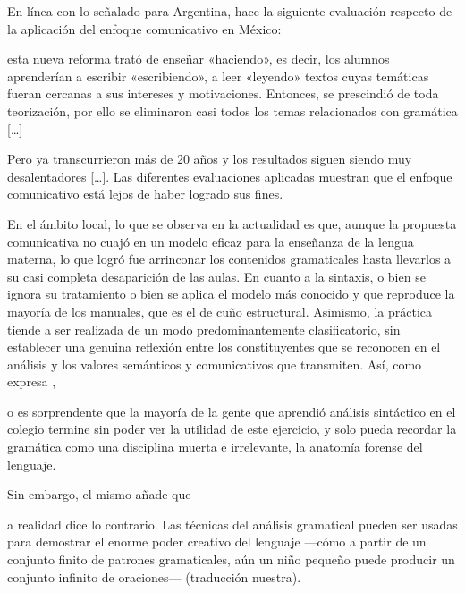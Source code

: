 En línea con lo señalado para Argentina, \textcite[18]{munguia2015} hace la
siguiente evaluación respecto de la aplicación del enfoque comunicativo en
México:

\begin{cita}
esta nueva reforma trató de enseñar «haciendo», es decir, los alumnos
aprenderían a escribir «escribiendo», a leer «leyendo» textos cuyas temáticas
fueran cercanas a sus intereses y motivaciones. Entonces, se prescindió de toda
teorización, por ello se eliminaron casi todos los temas relacionados con
gramática [\ldots]

Pero ya transcurrieron más de 20 años y los resultados siguen siendo muy
desalentadores [\ldots]. Las diferentes evaluaciones aplicadas muestran que el
enfoque comunicativo está lejos de haber logrado sus fines.
\end{cita}

En el ámbito local, lo que se observa en la actualidad es que, aunque la
propuesta comunicativa no cuajó en un modelo eficaz para la enseñanza de la
lengua materna, lo que logró fue arrinconar los contenidos gramaticales hasta
llevarlos a su casi completa desaparición de las aulas. En cuanto a la
sintaxis, o bien se ignora su tratamiento o bien se aplica el modelo más
conocido y que reproduce la mayoría de los manuales, que es el de cuño
estructural. Asimismo, la práctica tiende a ser realizada de un modo
predominantemente clasificatorio, sin establecer una genuina reflexión entre
los constituyentes que se reconocen en el análisis y los valores semánticos y
comunicativos que transmiten. Así, como expresa \textcite{crystal2007},

\begin{cita}
[n]o es sorprendente que la mayoría de la gente que aprendió análisis
sintáctico en el colegio termine sin poder ver la utilidad de este ejercicio, y
solo pueda recordar la gramática como una disciplina muerta e irrelevante, la
anatomía forense del lenguaje.
\end{cita}

\noindent Sin embargo, el mismo \textcite{crystal2007} añade que

\begin{cita}
[l]a realidad dice lo contrario. Las técnicas del análisis gramatical pueden
ser usadas para demostrar el enorme poder creativo del lenguaje ---cómo a
partir de un conjunto finito de patrones gramaticales, aún un niño pequeño
puede producir un conjunto infinito de oraciones--- (traducción nuestra).
\end{cita}

